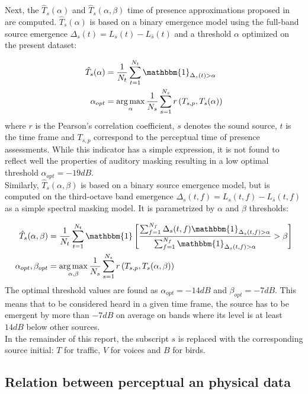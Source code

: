 \documentclass[11pt,a4paper]{article}
\DeclareMathOperator*{\argmax}{arg\,max}
\begin{document}
Next, the $\hat T_s(\alpha)$ and $\hat T_s(\alpha, \beta)$ time of presence approximations proposed in~\cite{gontier2018} are computed. $\hat T_s(\alpha)$ is based on a binary emergence model using the full-band source emergence $\Delta_s(t) = L_s(t) - L_{\bar{s}}(t)$ and a threshold $\alpha$ optimized on the present dataset:

\begin{align}
\hat T_s(\alpha) &= \frac{1}{N_t}\sum_{t = 1}^{N_t}\mathbbm{1}_{\Delta_s(t)>\alpha}\\
\alpha_{opt} &= \argmax_{\alpha}\frac{1}{N_s}\sum_{s = 1}^{N_s}r\left(T_{s, p}, T_s(\alpha)\right)
\end{align}
where $r$ is the Pearson's correlation coefficient, $s$ denotes the sound source, $t$ is the time frame and $T_{s, p}$ correspond to the perceptual time of presence assessments. While this indicator has a simple expression, it is not found to reflect well the properties of auditory masking resulting in a low optimal threshold $\alpha_{opt} = -19dB$.\\

Similarly, $\hat T_s(\alpha, \beta)$ is based on a binary source emergence model, but is computed on the third-octave band emergence $\Delta_s(t, f) = L_s(t, f) - L_{\bar{s}}(t, f)$ as a simple spectral masking model. It is parametrized by $\alpha$ and $\beta$ thresholds:

\begin{align}
\hat T_s(\alpha, \beta) &= \frac{1}{N_t}\sum_{t = 1}^{N_t}\mathbbm{1}\left[ \frac{\sum_{f = 1}^{N_f}\Delta_s(t, f)\mathbbm{1}_{\Delta_s(t, f)>\alpha}}{\sum_{f = 1}^{N_f}\mathbbm{1}_{\Delta_s(t, f)>\alpha}}>\beta \right]\\
\alpha_{opt},\beta_{opt} &= \argmax_{\alpha, \beta}\frac{1}{N_s}\sum_{s = 1}^{N_s}r\left(T_{s, p}, T_s(\alpha, \beta)\right)
\end{align}
The optimal threshold values are found as $\alpha_{opt} = -14dB$ and $\beta_{opt} = -7dB$. This means that to be considered heard in a given time frame, the source has to be emergent by more than $-7dB$ on average on bands where its level is at least $14dB$ below other sources.\\

In the remainder of this report, the subscript $s$ is replaced with the corresponding source initial: $T$ for traffic, $V$ for voices and $B$ for birds.

\subsection{Relation between perceptual an physical data}
\label{sec:phys_mdls}
\end{document}
